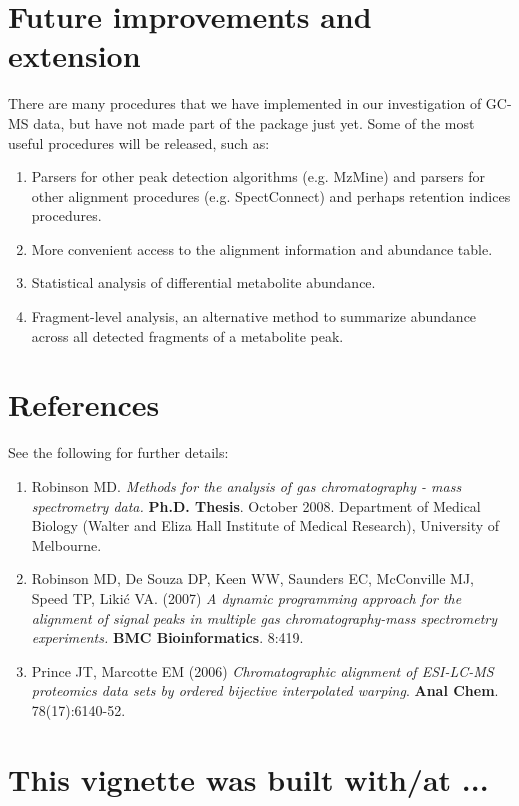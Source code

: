 \documentclass{article}\usepackage[]{graphicx}\usepackage[]{color}
\begin{document}
\section{Future improvements and extension}
There are many procedures that we have implemented in our
investigation of GC-MS data, but have not made part of the package just
yet. Some of the most useful procedures will be released, such as: 

\begin{enumerate}
\item Parsers for other peak detection algorithms (e.g. %
  MzMine) and parsers for other alignment procedures
  (e.g. SpectConnect) and perhaps retention indices procedures. 
\item More convenient access to the alignment information and
  abundance table. 
\item Statistical analysis of differential metabolite abundance.
\item Fragment-level analysis, an alternative method to summarize
  abundance across all detected fragments of a metabolite peak. 
\end{enumerate}

\section{References}
See the following for further details:

\begin{enumerate}
\item Robinson MD. {\em Methods for the analysis of gas chromatography
    - mass spectrometry data.} {\bf Ph.D. Thesis}. October 2008.
  Department of Medical Biology (Walter and Eliza Hall Institute of
  Medical Research), University of Melbourne. 
\item Robinson MD, De Souza DP, Keen WW, Saunders EC, McConville MJ,
  Speed TP, Liki\'{c} VA. (2007) {\em A dynamic programming approach
    for the alignment of signal peaks in multiple gas
    chromatography-mass spectrometry experiments.} {\bf BMC
    Bioinformatics}. 8:419. 
\item Prince JT, Marcotte EM (2006) {\em Chromatographic alignment of
    ESI-LC-MS proteomics data sets by ordered bijective interpolated
    warping}. {\bf Anal Chem}. 78(17):6140-52. 
\end{enumerate}

\section{This vignette was built with/at ...}
\end{document}
